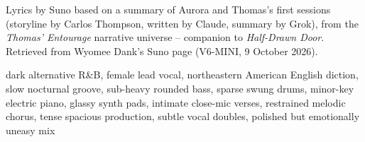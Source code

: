 \begin{notes}
Lyrics by Suno based on a summary of Aurora and Thomas's first sessions (storyline by Carlos Thompson, written by Claude, summary by Grok), from the \emph{Thomas' Entourage} narrative universe -- companion to \emph{Half-Drawn Door}. Retrieved from Wyomee Dank's Suno page (V6-MINI, 9 October 2026).
\end{notes}
\begin{style}
dark alternative R\&B, female lead vocal, northeastern American English diction, slow nocturnal groove, sub-heavy rounded bass, sparse swung drums, minor-key electric piano, glassy synth pads, intimate close-mic verses, restrained melodic chorus, tense spacious production, subtle vocal doubles, polished but emotionally uneasy mix
\end{style}

